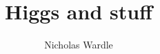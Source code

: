 \documentclass[a4paper,12pt,twoside]{report}
\begin{document}
\title{\LARGE {\bf Higgs and stuff}\\
 \vspace*{6mm}
}

\author{Nicholas Wardle}

\maketitle
\end{document}
